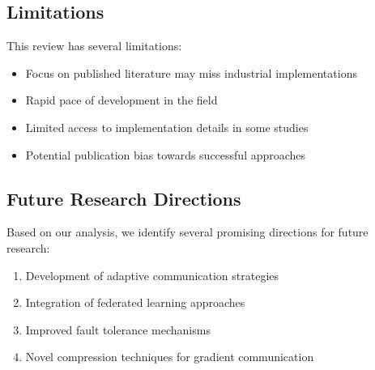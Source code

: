\subsection{Limitations}
This review has several limitations:
\begin{itemize}
    \item Focus on published literature may miss industrial implementations
    \item Rapid pace of development in the field
    \item Limited access to implementation details in some studies
    \item Potential publication bias towards successful approaches
\end{itemize}

\subsection{Future Research Directions}
Based on our analysis, we identify several promising directions for future research:
\begin{enumerate}
    \item Development of adaptive communication strategies
    \item Integration of federated learning approaches
    \item Improved fault tolerance mechanisms
    \item Novel compression techniques for gradient communication
\end{enumerate} 
